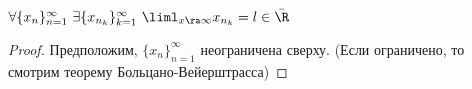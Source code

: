 \begin{addition}
	$\forall \{x_n\}_{n = 1}^\infty\ \exists \{x_{n_k}\}_{k = 1}^\infty\ \liml_{x \ra \infty} x_{n_k} = l \in \bar{\R}$
\end{addition}

\begin{proof}
	Предположим, $\{x_n\}_{n = 1}^\infty$ неограничена сверху. (Если ограничено, то смотрим теорему Больцано-Вейерштрасса)
\end{proof}

